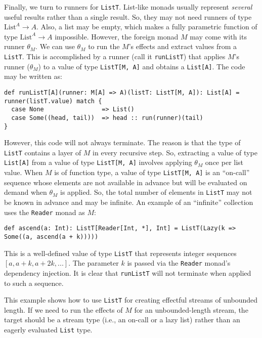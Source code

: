 Finally, we turn to runners for \lstinline!ListT!. List-like monads
usually represent \emph{several} useful results rather than a single
result. So, they may not need runners of type $\text{List}^{A}\rightarrow A$.
Also, a list may be empty, which makes a fully parametric function
of type $\text{List}^{A}\rightarrow A$ impossible. However, the foreign
monad $M$ may come with its runner $\theta_{M}$. We can use $\theta_{M}$
to run the $M$\textsf{'}s effects and extract values from a \lstinline!ListT!.
This is accomplished by a runner (call it \lstinline!runListT!) that
applies $M$\textsf{'}s runner ($\theta_{M}$) to a value of type \lstinline!ListT[M, A]!
and obtains a \lstinline!List[A]!. The code may be written as:
\begin{lstlisting}
def runListT[A](runner: M[A] => A)(listT: ListT[M, A]): List[A] = runner(listT.value) match {
  case None                => List()
  case Some((head, tail))  => head :: run(runner)(tail)
}
\end{lstlisting}
However, this code will not always terminate. The reason is that the
type of \lstinline!ListT! contains a layer of $M$ in every recursive
step. So, extracting a value of type \lstinline!List[A]! from a value
of type \lstinline!ListT[M, A]! involves applying $\theta_{M}$ once
per list value. When $M$ is of function type, a value of type \lstinline!ListT[M, A]!
is an \textsf{``}on-call\textsf{''} sequence whose elements
are not available in advance but will be evaluated on demand when
$\theta_{M}$ is applied. So, the total number of elements in \lstinline!ListT!
may not be known in advance and may be infinite. An example of an
\textsf{``}infinite\textsf{''} collection uses the \lstinline!Reader! monad as $M$:
\begin{lstlisting}
def ascend(a: Int): ListT[Reader[Int, *], Int] = ListT(Lazy(k => Some((a, ascend(a + k)))))
\end{lstlisting}
This is a well-defined value of type \lstinline!ListT! that represents
integer sequences $\left[a,a+k,a+2k,...\right]$. The parameter $k$
is passed via the \lstinline!Reader! monad\textsf{'}s dependency injection.
It is clear that \lstinline!runListT! will not terminate when applied
to such a sequence. 

This example shows how to use \lstinline!ListT! for creating effectful
streams of unbounded length. If we need to run the effects of $M$
for an unbounded-length stream, the target should be a stream type
(i.e., an on-call or a lazy list) rather than an eagerly evaluated
\lstinline!List! type.

